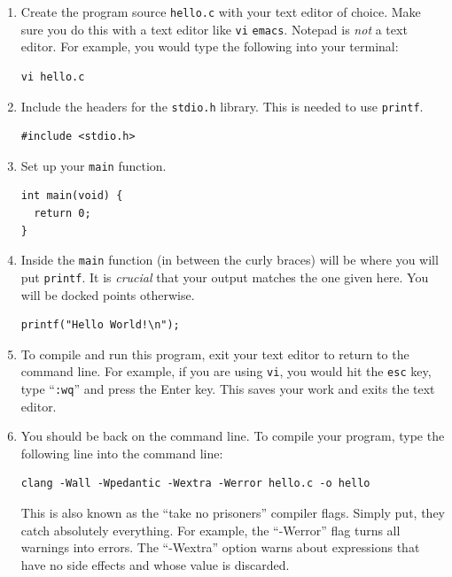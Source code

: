 \documentclass[11pt]{article}
\begin{document}
\begin{enumerate}
\item Create the program source \texttt{hello.c} with your
text editor of choice. Make sure you do this with a text
editor like \texttt{vi} \texttt{emacs}. Notepad is \emph{not} a text editor.
For example, you would type the following into your terminal:
\begin{lstlisting}
vi hello.c
\end{lstlisting}

	\item Include the headers for the \texttt{stdio.h} library. This is needed to use \texttt{printf}.
\begin{lstlisting}
#include <stdio.h>
\end{lstlisting}

	\item Set up your \texttt{main} function.
\begin{lstlisting}
int main(void) {
  return 0;
}
\end{lstlisting}

	\item Inside the \texttt{main} function (in between the curly braces) will
        be where you will put \texttt{printf}. It is \emph{crucial} that your output matches the one given here. You will be docked points otherwise.

\begin{lstlisting}
printf("Hello World!\n");
\end{lstlisting}

	\item To compile and run this program, exit your text editor to return to the command line. For example, if you are using \texttt{vi}, you would hit the \texttt{esc} key, type ``\texttt{:wq}'' and press the Enter key. This saves your work and exits the text editor.

	\item You should be back on the command line. To compile your program, type the following line into the command line:
\begin{lstlisting}
clang -Wall -Wpedantic -Wextra -Werror hello.c -o hello\end{lstlisting}

This is also known as the ``take no prisoners'' compiler flags.
Simply put, they catch absolutely everything. For example, the
``-Werror'' flag turns all warnings into errors. The ``-Wextra''
option warns about expressions that have no side effects and whose
value is discarded.


\end{enumerate}
\end{document}
